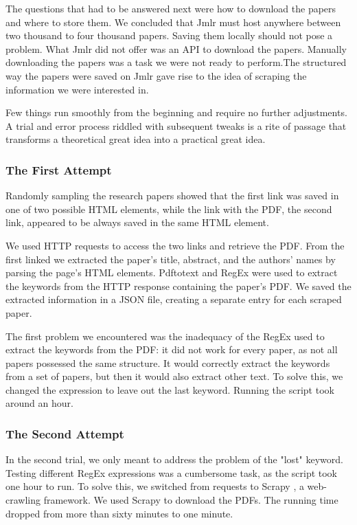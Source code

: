 The questions that had to be answered next were how to download the papers and where to store them. We concluded that Jmlr \cite{jmlr} must host anywhere between two thousand to four thousand papers. Saving them locally should not pose a problem. What Jmlr \cite{jmlr} did not offer was an API to download the papers. Manually downloading the papers was a task we were not ready to perform.The structured way the papers were saved on Jmlr \cite{jmlr}  gave rise to the idea of scraping the information we were interested in. 


Few things run smoothly from the beginning and require no further adjustments. A trial and error process riddled with subsequent tweaks is a rite of passage that transforms a theoretical great idea into a practical great idea.
\subsubsection{The First Attempt}
\subsubcomment{}
Randomly sampling the research papers showed that the first link was saved in one of two possible HTML elements, while the link with the PDF, the second link, appeared to be always saved in the same HTML element.


We used HTTP requests to access the two links and retrieve the PDF. From the first linked we extracted the paper's title, abstract, and the authors' names by parsing the page's HTML elements. Pdftotext \cite{p2t} and RegEx were used to extract the keywords from the HTTP response containing the paper's PDF. We saved the extracted information in a JSON file, creating a separate entry for each scraped paper.


The first problem we encountered was the inadequacy of the RegEx used to extract the keywords from the PDF: it did not work for every paper, as not all papers possessed the same structure. It would correctly extract the keywords from a set of papers, but then it would also extract other text. To solve this, we changed the expression to leave out the last keyword. Running the script took around an hour. 

\subsubsection{The Second Attempt} 
\subsubcomment{}
In the second trial, we only meant to address the problem of the "lost" keyword. Testing different RegEx expressions was a cumbersome task, as the script took one hour to run. To solve this, we switched from requests to Scrapy \cite{kouzis2016learning}, a web-crawling framework. We used Scrapy \cite{kouzis2016learning} to download the PDFs. The running time dropped from more than sixty minutes to one minute. 


